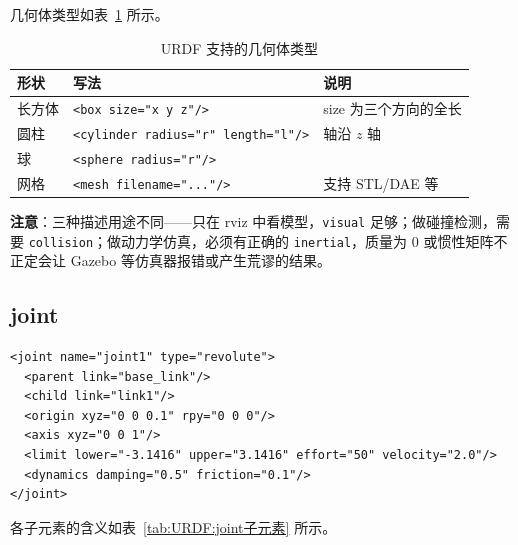 几何体类型如表~\ref{tab:URDF:几何体} 所示。

\begin{table}[H]
	\centering
	\caption{URDF 支持的几何体类型}
	\label{tab:URDF:几何体}
	\footnotesize
	\begin{tabular}{llp{5.5cm}}
		\hline
		形状 & 写法 & 说明 \\
		\hline
		长方体 & \texttt{<box size="x y z"/>} & size 为三个方向的全长 \\
		圆柱 & \texttt{<cylinder radius="r" length="l"/>} & 轴沿 $z$ 轴 \\
		球 & \texttt{<sphere radius="r"/>} & \\
		网格 & \texttt{<mesh filename="..."/>} & 支持 STL/DAE 等 \\
		\hline
	\end{tabular}
\end{table}

\textbf{注意}：三种描述用途不同——只在 rviz 中看模型，\texttt{visual} 足够；做碰撞检测，需要 \texttt{collision}；做动力学仿真，必须有正确的 \texttt{inertial}，质量为 0 或惯性矩阵不正定会让 Gazebo 等仿真器报错或产生荒谬的结果。

\subsection{joint}

\begin{lstlisting}[style=xml]
<joint name="joint1" type="revolute">
  <parent link="base_link"/>
  <child link="link1"/>
  <origin xyz="0 0 0.1" rpy="0 0 0"/>
  <axis xyz="0 0 1"/>
  <limit lower="-3.1416" upper="3.1416" effort="50" velocity="2.0"/>
  <dynamics damping="0.5" friction="0.1"/>
</joint>
\end{lstlisting}

各子元素的含义如表~\ref{tab:URDF:joint子元素} 所示。

